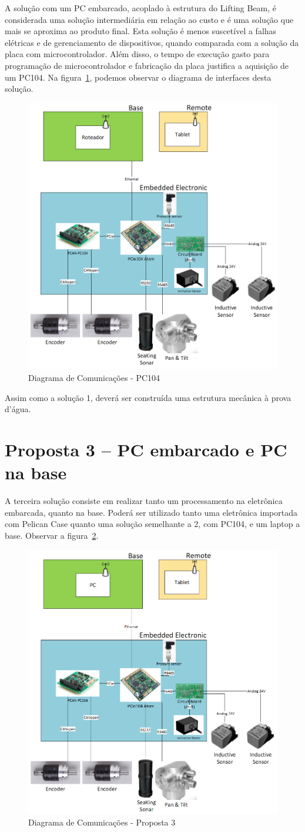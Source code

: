 A solução com um PC embarcado, acoplado à estrutura do Lifting Beam, é
considerada uma solução intermediária em relação ao custo e é uma solução que
mais se aproxima ao produto final. Esta solução é menos suscetível a falhas
elétricas e de gerenciamento de dispositivos, quando comparada com a solução da
placa com microcontrolador. Além disso, o tempo de execução gasto para programação de microcontrolador e fabricação da placa justifica a aquisição de um PC104. Na figura~\ref{pc104}, podemos observar o diagrama de interfaces desta solução.

\begin{figure}[H]
    \centering
    \includegraphics[width=0.5\columnwidth]{figs/eletronica/4.png}
    \caption{Diagrama de Comunicações - PC104}
    \label{pc104}
\end{figure} 
 
Assim como a solução 1, deverá ser construída uma estrutura mecânica à prova d’água.

\section{Proposta 3 – PC embarcado e PC na base}

A terceira solução consiste em realizar tanto um processamento na eletrônica
embarcada, quanto na base. Poderá ser utilizado tanto uma eletrônica importada
com Pelican Case quanto uma solução semelhante a 2, com PC104, e um laptop a
base. Observar a figura~\ref{prop3}.

\begin{figure}[H]
    \centering
    \includegraphics[width=0.5\columnwidth]{figs/eletronica/5.png}
    \caption{Diagrama de Comunicações - Proposta 3}
    \label{prop3}
\end{figure} 

